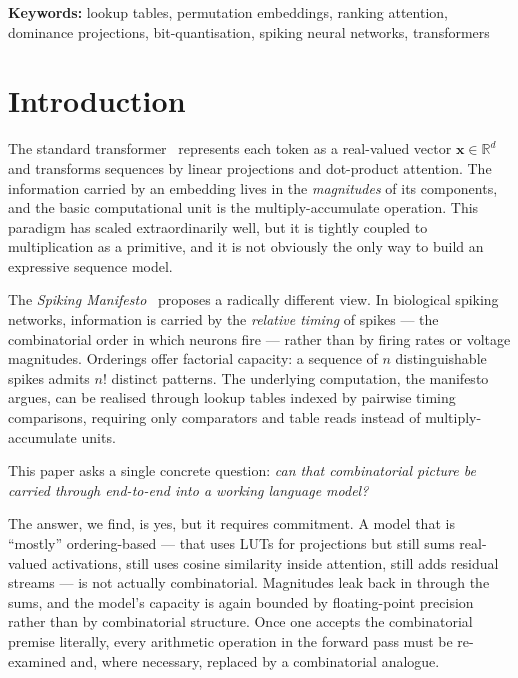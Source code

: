 \documentclass[11pt]{article}
\begin{document}
\medskip
\noindent\textbf{Keywords:} lookup tables, permutation embeddings, ranking attention, dominance projections, bit-quantisation, spiking neural networks, transformers


\section{Introduction}
\label{sec:intro}

The standard transformer~\cite{ref:vaswani} represents each token as a real-valued vector $\mathbf{x} \in \mathbb{R}^d$ and transforms sequences by linear projections and dot-product attention.
The information carried by an embedding lives in the \emph{magnitudes} of its components, and the basic computational unit is the multiply-accumulate operation.
This paradigm has scaled extraordinarily well, but it is tightly coupled to multiplication as a primitive, and it is not obviously the only way to build an expressive sequence model.

The \emph{Spiking Manifesto}~\cite{ref:manifesto} proposes a radically different view.
In biological spiking networks, information is carried by the \emph{relative timing} of spikes --- the combinatorial order in which neurons fire --- rather than by firing rates or voltage magnitudes.
Orderings offer factorial capacity: a sequence of $n$ distinguishable spikes admits $n!$ distinct patterns.
The underlying computation, the manifesto argues, can be realised through lookup tables indexed by pairwise timing comparisons, requiring only comparators and table reads instead of multiply-accumulate units.

This paper asks a single concrete question: \emph{can that combinatorial picture be carried through end-to-end into a working language model?}

The answer, we find, is yes, but it requires commitment.
A model that is ``mostly'' ordering-based --- that uses LUTs for projections but still sums real-valued activations, still uses cosine similarity inside attention, still adds residual streams --- is not actually combinatorial.
Magnitudes leak back in through the sums, and the model's capacity is again bounded by floating-point precision rather than by combinatorial structure.
Once one accepts the combinatorial premise literally, every arithmetic operation in the forward pass must be re-examined and, where necessary, replaced by a combinatorial analogue.
\end{document}
